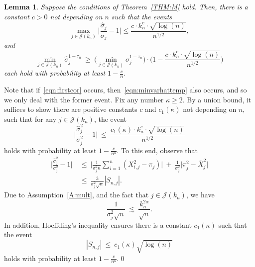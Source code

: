 \documentclass[aos,preprint]{imsart}
\numberwithin{equation}{section}
\theoremstyle{plain}
\newtheorem{lemma}{Lemma}[section]
\renewcommand{\hat}[1]{\widehat{#1}}
\newcommand{\J}{\mathcal{J}}
\newcommand{\ts}{\textstyle}
\newcommand{\1}{{\bf{1}}}
\newcommand{\0}{\mathbf{0}}
\begin{document}
\begin{lemma}\label{lem:corM}
Suppose the conditions of Theorem~\ref{THM:M} hold. Then, there is a constant $c>0$ not depending on $n$ such that the events
\begin{equation}\label{eqn:firstcor}
 \max_{j\in\J(k_n)}\Big| \ts\frac{\hat\sigma_j}{\sigma_j}-1\Big| \leq \ts \frac{c\cdot k_n^c\cdot\sqrt{\log(n)}}{n^{1/2}},
\end{equation}
%
and
%
\begin{equation}\label{eqn:minvarhattemp}
 \min_{j\in\J(k_n)}\hat\sigma_j^{1-\tau_n} \ \geq \ \Big(\min_{j\in\J(k_n)} \sigma_j^{1-\tau_n}\Big)\cdot \Big(1-\ts\frac{c\cdot k_n^c\cdot \sqrt{\log(n)}}{n^{1/2}}\Big)
\end{equation}
each
hold with probability at least $1-\ts\frac{c}{n}$.
\end{lemma}

\proof  Note that if~\eqref{eqn:firstcor} occurs, then~\eqref{eqn:minvarhattemp} also occurs, and so we only deal with the former event. Fix any number $\kappa\geq 2$. By a union bound, it suffices to show there are positive constants $c$ and $c_1(\kappa)$ not depending on $n$, such that for any $j\in\J(k_n)$, the event
%
%
\begin{equation}\label{eqn:corevent}
 \Big| \ts\frac{\hat{\sigma}_j^2}{\sigma_j^2}-1\Big| \ \leq \ \frac{c_1(\kappa)\cdot k_n^c\cdot \sqrt{\log(n)}}{n^{1/2}}
\end{equation}
holds with probability at least $1-\frac{c}{n^{\kappa}}$. 
%
To this end, observe that
\begin{equation*}
\begin{split}
\Big| \ts\frac{\hat{\sigma}_j^2}{\sigma_j^2}-1\Big| & \ \leq \ \Big|\ts\frac{1}{\sigma_j^2n} \sum_{i=1}^n (X_{i,j}^2-\pi_j) \Big| \ + \ \ts\frac{1}{\sigma_j^2}\big|\pi_j^2-\bar{X}_j^2\big|\\[0.3cm]
  & \ \leq \  \ts\frac{3}{\sigma_j^2 \sqrt{n}}|S_{n,j}|.
%
 \end{split}
\end{equation*}
Due to Assumption~\ref{A:mult}, and the fact that $j\in\J(k_n)$, we have 
$$\ts\frac{1}{\sigma_j^2\sqrt n} \ \lesssim  \ \ts\frac{k_n^{2\alpha}}{\sqrt n}.$$
In addition, Hoeffding's inequality ensures there is a constant $c_1(\kappa)$ such that the event
\begin{equation*}
|S_{n,j}| \ \leq \ c_1(\kappa)\sqrt{\log(n)}
\end{equation*}
holds with probability at least $1-\frac{c}{n^{\kappa}}$.\qed
\end{document}
